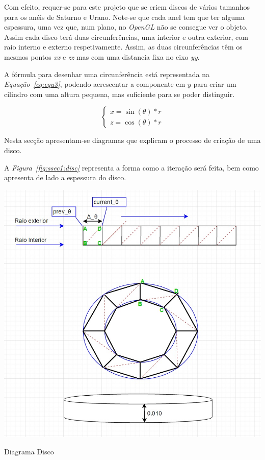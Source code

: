 Com efeito, requer-se para este projeto que se criem discos de vários tamanhos
para os anéis de Saturno e Urano. Note-se que cada anel tem que ter alguma
espessura, uma vez que, num plano, no \emph{OpenGL} não se consegue ver
o objeto. Assim cada disco terá duas circunferências, uma interior e outra
exterior, com raio interno e externo respetivamente. Assim, as duas
circunferências têm os mesmos pontos \emph{xx} e \emph{zz} mas com uma distancia
fixa no eixo \emph{yy}. 

A fórmula para desenhar uma circunferência está representada na
\emph{Equação~\ref{eq:equ3}}, podendo acrescentar a componente em $y$ para criar
um cilindro com uma altura pequena, mas suficiente para se poder distinguir.

\begin{equation}
\begin{cases}
			x =  \sin(\theta) * r \\
	    z =  \cos(\theta) * r
\end{cases}
\label{eq:equ3}
\end{equation}



Nesta secção apresentam-se diagramas que explicam o processo de criação de uma
disco.

A \emph{Figura~\ref{fig:ssec1:disc}} representa a forma como a iteração será
feita, bem como apresenta de lado a espessura do disco.


\begin{center}
 	
 	\includegraphics[width=\textwidth,height=\textheight,keepaspectratio]{resources/disco.jpg}
 	\captionsetup{type=figure, width=0.8\linewidth}
	\caption{Diagrama Disco}
\label{fig:ssec1:disc} 
\end{center}

